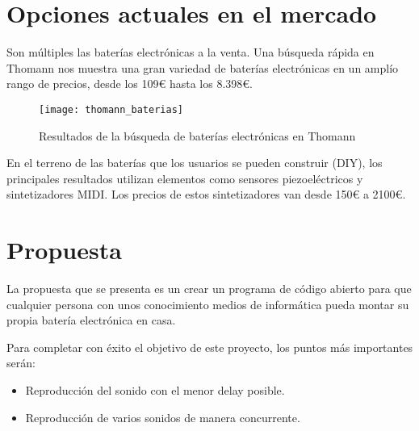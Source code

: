 

    \section{Opciones actuales en el mercado} %
    \label{sec:OpcionesActualesEnElMercado}

        Son múltiples las baterías electrónicas a la venta. Una búsqueda rápida en Thomann\cite{thomann_baterias} nos
        muestra una gran variedad de baterías electrónicas en un amplío rango de precios, desde los 109\euro{} hasta los
        8.398\euro{}.

        \begin{figure}[ht]
            \centering
            \texttt{[image: thomann\_baterias]}
            \caption{Resultados de la búsqueda de baterías electrónicas en Thomann\cite{thomann_baterias}
                     \label{fig:ThomannBusqueda}}
        \end{figure}

        En el terreno de las baterías que los usuarios se pueden construir (DIY), los principales resultados
        \cite{drum_magazine_diy_kit} utilizan elementos como sensores piezoeléctricos y sintetizadores MIDI. Los precios
        de estos sintetizadores van desde 150\euro{} a 2100\euro{}.


    \section{Propuesta} %
    \label{sec:Propuesta}

        La propuesta que se presenta es un crear un programa de código abierto para que cualquier persona con unos
        conocimiento medios de informática pueda montar su propia batería electrónica en casa.

        Para completar con éxito el objetivo de este proyecto, los puntos más importantes serán:
        \begin{itemize}
            \item Reproducción del sonido con el menor delay posible.
            \item Reproducción de varios sonidos de manera concurrente.
        \end{itemize}


